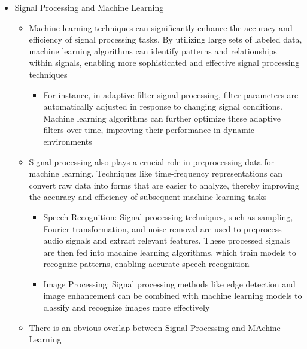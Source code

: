 \begin{itemize}
\begin{itemize}
\begin{itemize}
        \end{itemize}

    \end{itemize}

  \item Signal Processing and Machine Learning

    \begin{itemize}

      \item Machine learning techniques can significantly enhance the accuracy and efficiency of signal processing tasks. By utilizing large sets of labeled data, machine learning algorithms can identify patterns and relationships within signals, enabling more sophisticated and effective signal processing techniques

        \begin{itemize}

          \item For instance, in adaptive filter signal processing, filter parameters are automatically adjusted in response to changing signal conditions. Machine learning algorithms can further optimize these adaptive filters over time, improving their performance in dynamic environments

        \end{itemize}

      \item Signal processing also plays a crucial role in preprocessing data for machine learning. Techniques like time-frequency representations can convert raw data into forms that are easier to analyze, thereby improving the accuracy and efficiency of subsequent machine learning tasks

        \begin{itemize}

          \item Speech Recognition: Signal processing techniques, such as sampling, Fourier transformation, and noise removal are used to preprocess audio signals and extract relevant features. These processed signals are then fed into machine learning algorithms, which train models to recognize patterns, enabling accurate speech recognition

          \item Image Processing: Signal processing methods like edge detection and image enhancement can be combined with machine learning models to classify and recognize images more effectively

        \end{itemize}

      \item There is an obvious overlap between Signal Processing and MAchine Learning

    \end{itemize}

\end{itemize}



